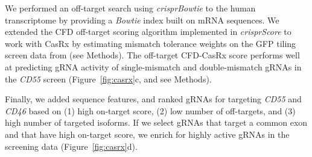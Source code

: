 \documentclass[pdftex,english,10pt]{article}
\begin{document}
We performed an off-target search using \textit{crisprBowtie} to the human transcriptome by providing a \textit{Bowtie} index built on mRNA sequences.
We extended the CFD off-target scoring algorithm implemented in \textit{crisprScore} to work with CasRx by estimating mismatch tolerance weights on the GFP tiling screen data from \citet{wessels2020massively} (see Methods). The off-target CFD-CasRx score performs well at predicting gRNA activity of single-mismatch and double-mismatch gRNAs in the \textit{CD55} screen (Figure~\ref{fig:casrx}c, and see Methods).  

Finally, we added sequence features, and ranked gRNAs for targeting \textit{CD55} and \textit{CD46} based on (1) high on-target score, (2) low number of off-targets, and (3) high number of targeted isoforms. If we select gRNAs that target a common exon and that have high on-target score, we enrich for highly active gRNAs in the screening data (Figure~\ref{fig:casrx}d). 
\end{document}
